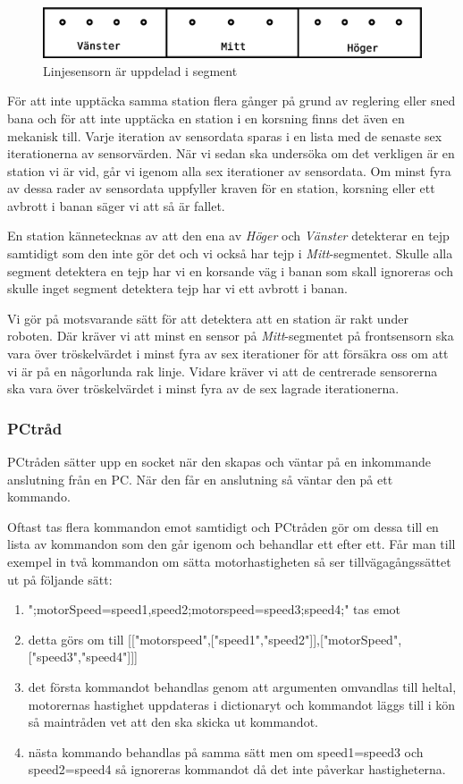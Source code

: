 \begin{figure}[h!]
	\centering
	\includegraphics[scale=0.4]{grafik/huvud-linjesensor}
	\caption{Linjesensorn är uppdelad i segment} \label{huvud-linjesensor}
\end{figure}

För att inte upptäcka samma station flera gånger på grund av reglering eller sned bana och för att inte upptäcka en station i en korsning finns det även en mekanisk till. Varje iteration av sensordata sparas i en lista med de senaste sex iterationerna av sensorvärden. När vi sedan ska undersöka om det verkligen är en station vi är vid, går vi igenom alla sex iterationer av sensordata. Om minst fyra av dessa rader av sensordata uppfyller kraven för en station, korsning eller ett avbrott i banan säger vi att så är fallet.

En station kännetecknas av att den ena av \textit{Höger} och \textit{Vänster} detekterar en tejp samtidigt som den inte gör det och vi också har tejp i \textit{Mitt}-segmentet. Skulle alla segment detektera en tejp har vi en korsande väg i banan som skall ignoreras och skulle inget segment detektera tejp har vi ett avbrott i banan.

Vi gör på motsvarande sätt för att detektera att en station är rakt under roboten. Där kräver vi att minst en sensor på \textit{Mitt}-segmentet på frontsensorn ska vara över tröskelvärdet i minst fyra av sex iterationer för att försäkra oss om att vi är på en någorlunda rak linje. Vidare kräver vi att de centrerade sensorerna ska vara över tröskelvärdet i minst fyra av de sex lagrade iterationerna.

\subsubsection{PCtråd}
PCtråden sätter upp en socket när den skapas och väntar på en inkommande anslutning från en PC. När den får en anslutning så väntar den på ett kommando.

Oftast tas flera kommandon emot samtidigt och PCtråden gör om dessa till en lista av kommandon som den går igenom och behandlar ett efter ett. Får man till exempel in två kommandon om sätta motorhastigheten så ser tillvägagångssättet ut på följande sätt:
\begin{enumerate}
\item ";motorSpeed=speed1,speed2;motorspeed=speed3;speed4;" tas emot
\item detta görs om till [["motorspeed",["speed1","speed2"]],["motorSpeed",["speed3","speed4"]]]
\item det första kommandot behandlas genom att argumenten omvandlas till heltal, motorernas hastighet uppdateras i dictionaryt och kommandot läggs till i kön så maintråden vet att den ska skicka ut kommandot.
\item nästa kommando behandlas på samma sätt men om speed1=speed3 och speed2=speed4 så ignoreras kommandot då det inte påverkar hastigheterna.
\end{enumerate}

